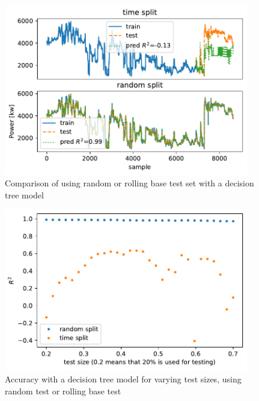 \begin{figure}[H]
\begin{center}\includegraphics[width = 0.95\textwidth]{figures/train_test_random.pdf}\end{center}
\vspace{-0.7cm}
\caption{Comparison of using random or rolling base test set with a decision tree model }
\label{fig:train_test_random}
\end{figure}
\begin{figure}[H]
\begin{center}\includegraphics[width = 0.95\textwidth]{figures/test_size_variation.pdf}\end{center}
\vspace{-0.7cm}
\caption{Accuracy with a decision tree model for varying test sizes, using random test or rolling base test}
\label{fig:test_size_variation}
\end{figure}
